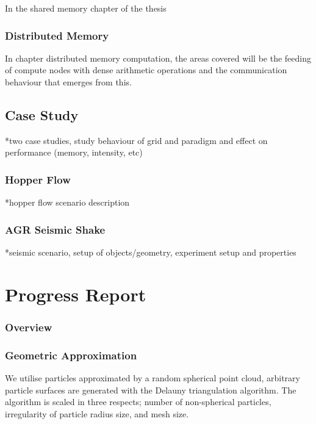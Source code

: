 \documentclass[times,12pt]{article}
\begin{document}
In the shared memory chapter of the thesis


\subsubsection{Distributed Memory}

In chapter distributed memory computation, the areas covered will be the feeding of compute nodes with dense arithmetic operations and the communication behaviour that emerges from this.


\subsection{Case Study}

*two case studies, study behaviour of grid and paradigm and effect on performance (memory, intensity, etc)

\subsubsection{Hopper Flow}

*hopper flow scenario description

\subsubsection{AGR Seismic Shake}

*seismic scenario, setup of objects/geometry, experiment setup and properties






\section{Progress Report}

\subsubsection{Overview}



\subsubsection{Geometric Approximation}

We utilise particles approximated by a random spherical point cloud, arbitrary particle surfaces are generated with the Delauny triangulation algorithm. The algorithm is scaled in three respects; number of non-spherical particles, irregularity of particle radius size, and mesh size.
\end{document}
